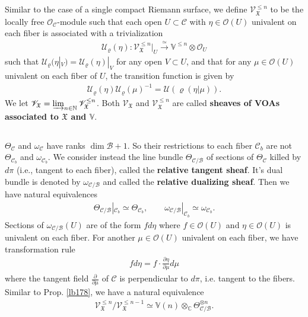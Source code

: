 \documentclass[12pt,a4paper,notitlepage]{article}
\theoremstyle{definition}
\theoremstyle{plain}
\newcommand{\fk}{\mathfrak}
\newcommand{\mc}{\mathcal}
\newcommand{\scr}{\mathscr}
\newcommand{\Vbb}{\mathbb V}
\newcommand{\Cbb}{\mathbb C}
\newcommand{\Nbb}{\mathbb N}
\numberwithin{equation}{section}
\begin{document}
Similar to the case of a single compact Riemann surface, we define $\scr V^{\leq n}_{\fk X}$ \index{VX@$\scr V^{\leq n}_{\fk X},\scr V_{\fk X}$} to be the locally free $\scr O_{\mc C}$-module such that each open $U\subset\mc C$ with $\eta\in\scr O(U)$ univalent on each fiber is associated with a trivialization \index{U@$\mc U_\varrho(\eta)$}
\begin{align}
\mc U_\varrho(\eta):\scr V^{\leq n}_{\fk X}|_U\xrightarrow{\simeq}\Vbb^{\leq n}\otimes\scr O_U
\end{align}
such that $\mc U_\varrho(\eta|_V)=\mc U_\varrho(\eta)|_V$ for any open $V\subset U$, and that for any $\mu\in\scr O(U)$ univalent on each fiber of $U$, the transition function is given by
\begin{align}
\mc U_\varrho(\eta)\mc U_\varrho(\mu)^{-1}=\mc U(\varrho(\eta|\mu)).
\end{align}
We let $\scr V_{\fk X}=\varinjlim_{n\in\Nbb}\scr V_{\fk X}^{\leq n}$. Both $\scr V_{\fk X}$ and $\scr V_{\fk X}^{\leq n}$ are called \textbf{sheaves of VOAs associated to $\fk X$ and $\Vbb$}.





\subsection{}


$\Theta_{\mc C}$ and $\omega_{\mc C}$ have ranks $\dim\mc B+1$. So their restrictions to each fiber $\mc C_b$ are not $\Theta_{\mc C_b}$ and $\omega_{\mc C_b}$. We consider instead the line bundle $\Theta_{\mc C/\mc B}$ \index{zz@$\Theta_{\mc C/\mc B}$} of sections of $\Theta_{\mc C}$ killed by $d\pi$ (i.e., tangent to each fiber), called the \textbf{relative tangent sheaf}. It's dual bundle is denoted by $\omega_{\mc C/\mc B}$ \index{zz@$\omega_{\mc C/\mc B}$} and called the \textbf{relative dualizing sheaf}. Then we have natural equivalences
\begin{align}
\Theta_{\mc C/\mc B}|_{\mc C_b}\simeq\Theta_{\mc C_b},\qquad \omega_{\mc C/\mc B}|_{\mc C_b}\simeq\omega_{\mc C_b}.
\end{align}
Sections of $\omega_{\mc C/\mc B}(U)$ are of the form $fd\eta$ where $f\in\scr O(U)$ and $\eta\in\scr O(U)$ is univalent on each fiber. For another $\mu\in\scr O(U)$ univalent on each fiber, we have transformation rule
\begin{align}
fd\eta=f\cdot\frac{\partial\eta}{\partial\mu}d\mu
\end{align}
where the tangent field $\frac{\partial}{\partial\mu}$ of $\mc C$ is perpendicular to $d\pi$, i.e. tangent to the fibers. Similar to Prop. \ref{lb178}, we have a natural equivalence
\begin{align}
\scr V_{\fk X}^{\leq n}/\scr V_{\fk X}^{\leq n-1}\simeq \Vbb(n)\otimes_\Cbb\Theta_{\mc C/\mc B}^{\otimes n}.
\end{align}
\end{document}

